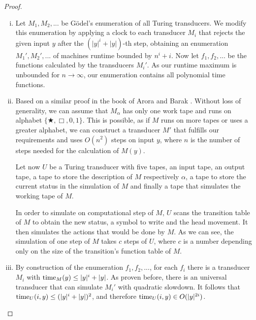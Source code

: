   \begin{proof}
    \begin{enumerate}[(i)]
     \item Let \(M_1, M_2, ...\) be Gödel's enumeration of all Turing transducers. We modify this enumeration by applying a clock to each transducer \(M_i\) that rejects the given input \(y\) after the \((|y|^i + |y|)\)-th step, obtaining an enumeration \(M_1', M_2', ...\) of machines runtime bounded by \(n^i+i\). Now let \(f_1,f_2,...\) be the functions calculated by the transducers \(M_i'\). As our runtime maximum is unbounded for \(n \to \infty\), our enumeration contains all polynomial time functions.
     
     \item Based on a similar proof in the book of Arora and Barak \cite{AB09}. Without loss of generality, we can assume that \(M_\alpha\) has only one work tape and runs on alphabet \( \{ \bigstar, \Box, 0, 1 \}\). This is possible, as if \(M\) runs on more tapes or uses a greater alphabet, we can construct a transducer \(M'\) that fulfills our requirements and uses \(O(n^2)\) steps on input \(y\), where \(n\) is the number of steps needed for the calculation of \(M(y)\). 
     
     Let now \(U\) be a Turing transducer with five tapes, an input tape, an output tape, a tape to store the description of \(M\) respectively \(\alpha\), a tape to store the current status in the simulation of \(M\) and finally a tape that simulates the working tape of \(M\).
     
     In order to simulate on computational step of \(M\), \(U\) scans the transition table of \(M\) to obtain the new status, a symbol to write and the head movement. It then simulates the actions that would be done by \(M\). As we can see, the simulation of one step of \(M\) takes \(c\) steps of \(U\), where \(c\) is a number depending only on the size of the transition's function table of \(M\).
     
     \item By construction of the enumeration \(f_1,f_2,...\), for each \(f_i\) there is a transducer \(M_i\) with \(\operatorname{time}_M(y) \leq |y|^i + |y|\). As proven before, there is an universal transducer that can simulate \(M_i'\) with quadratic slowdown. It follows that \(\operatorname{time}_U(i,y) \leq (|y|^i + |y|)^2\), and therefore \(\operatorname{time}_U(i,y) \in O(|y|^{2i})\).
    \end{enumerate}
  \end{proof}
  
